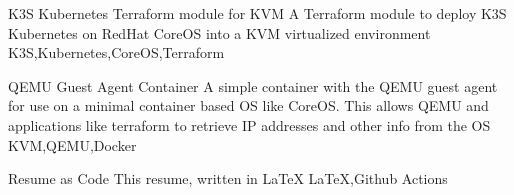 %
%
%


\begin{projects}
	\project
	{K3S Kubernetes Terraform module for KVM}{}
	{}
	{A Terraform module to deploy K3S Kubernetes on RedHat CoreOS into a KVM virtualized environment}
	{K3S,Kubernetes,CoreOS,Terraform}

	\project
	{QEMU Guest Agent Container}{}
	{}
	{A simple container with the QEMU guest agent for use on a minimal container based OS like CoreOS. This allows QEMU and applications like terraform to retrieve IP addresses and other info from the OS}
	{KVM,QEMU,Docker}

	\project
	{Resume as Code}{}
	{}
	{This resume, written in LaTeX}
	{LaTeX,Github Actions}
\end{projects}

